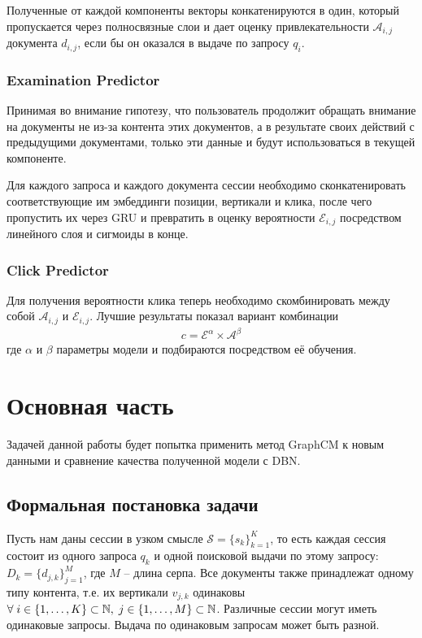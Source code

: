 \documentclass[diploma]{nanolab2015}
\begin{document}
Полученные от каждой компоненты векторы конкатенируются в один, который пропускается через полносвязные слои и дает оценку привлекательности $\mathcal{A}_{i,j}$ документа $d_{i,j}$, если бы он оказался в выдаче по запросу ${q_i}$.

\subsection{Examination Predictor}
Принимая во внимание гипотезу, что пользователь продолжит обращать внимание на документы не из-за контента этих документов, а в результате своих действий с предыдущими документами, только эти данные и будут использоваться в текущей компоненте.

Для каждого запроса и каждого документа сессии необходимо сконкатенировать соответствующие им эмбеддинги позиции, вертикали и клика, после чего пропустить их через GRU и превратить в оценку вероятности $\mathcal{E}_{i,j}$ посредством линейного слоя и сигмоиды в конце.

\subsection{Click Predictor}
Для получения вероятности клика теперь необходимо скомбинировать между собой $\mathcal{A}_{i,j}$ и $\mathcal{E}_{i,j}$. Лучшие результаты показал вариант комбинации
\begin{align}
    c = \mathcal{E}^\alpha \times \mathcal{A}^\beta
\end{align}
где $\alpha$ и $\beta$ параметры модели и подбираются посредством её обучения.
\chapter{Основная часть}
Задачей данной работы будет попытка применить метод GraphCM к новым данными и сравнение качества полученной модели с DBN.
\section{Формальная постановка задачи}
Пусть нам даны сессии в узком смысле $\mathcal{S} = \{s_k\}_{k=1}^K$, то есть каждая сессия состоит из одного запроса $q_k$ и одной поисковой выдачи по этому запросу: $D_k = \{d_{j, k}\}_{j=1}^M$, где $M$ -- длина серпа. Все документы также принадлежат одному типу контента, т.е. их вертикали $v_{j, k}$ одинаковы $\forall \; \space i \in \{1, \dots, K\} \subset \mathbb{N}, \; j \in \{1, \dots, M\} \subset \mathbb{N}$. Различные сессии могут иметь одинаковые запросы. Выдача по одинаковым запросам может быть разной.
\end{document}
